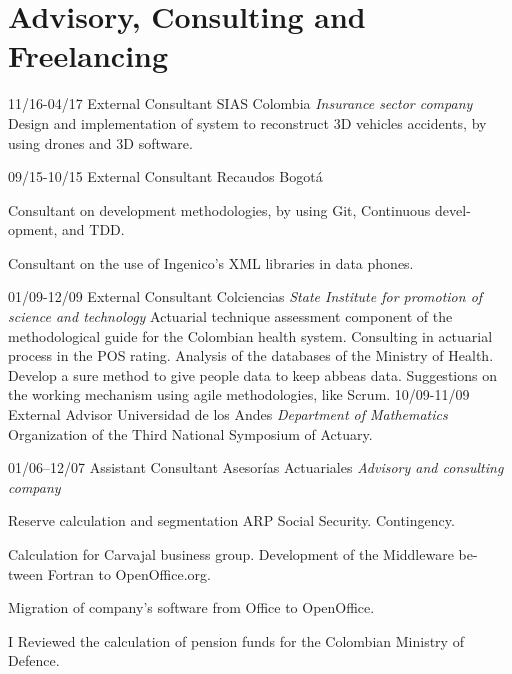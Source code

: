 \section{Advisory, Consulting and Freelancing}
\begin{entrylist}

  \entry
	{11/16-04/17}
	{External Consultant}
	{SIAS Colombia {\sl Insurance sector company}}
	{Design and implementation of system to reconstruct 3D vehicles accidents,
	by using drones and 3D software.}

  \entry
	{09/15-10/15}
	{External Consultant}
	{Recaudos Bogotá}
        {Consultant on development methodologies, by using Git, Continuous devel-
opment, and TDD.

	Consultant on the use of Ingenico’s XML libraries in data phones.}
  \entry
	{01/09-12/09}
	{External Consultant}
	{Colciencias {\sl State Institute for promotion of science and technology}}
        {Actuarial technique assessment component of the methodological guide for
	the Colombian health system.
	Consulting in actuarial process in the POS rating.
	Analysis of the databases of the Ministry of Health.
	Develop a sure method to give people data to keep abbeas data.
	Suggestions on the working mechanism using agile methodologies, like
	Scrum.}
  \entry
	{10/09-11/09}
	{External Advisor}
	{Universidad de los Andes {\sl Department of Mathematics}}
	{Organization of the Third National Symposium of Actuary.}

\end{entrylist}

\begin{entrylist}
  \entry
	{01/06–12/07}
	{Assistant Consultant}
	{Asesorías Actuariales {\sl Advisory and consulting company}}
	{Reserve calculation and segmentation ARP Social Security. Contingency.

Calculation for Carvajal business group. Development of the Middleware be-
tween Fortran to OpenOffice.org.

Migration of company’s software from Office to OpenOffice.

I Reviewed the calculation of pension funds for the Colombian Ministry of
	Defence.}

\end{entrylist}

